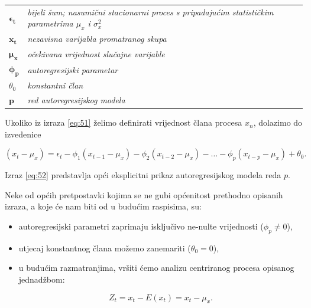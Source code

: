\documentclass[a4paper,12pt,oneside]{memoir}
\begin{document}
            \begin{table}[H]
                \centering
                \begin{tabular*}{0.9\textwidth}{>{\bfseries}l p{13cm}}
                    \textit{\textbf{$\boldsymbol{\epsilon_t}$}} & \textit{bijeli šum; nasumični stacionarni proces s pripadajućim statističkim parametrima $\mu_x$ i $\sigma_x^2$}\\
                    \textit{\textbf{$\boldsymbol{x_t}$}} & \textit{nezavisna varijabla promatranog skupa}\\
                    \textit{\textbf{$\boldsymbol{\mu_x}$}} & \textit{očekivana vrijednost slučajne varijable}\\
                    \textit{\textbf{$\boldsymbol{\phi_p}$}} & \textit{autoregresijski parametar}\\
                    \textit{\textbf{$\theta_0$}} & \textit{konstantni član}\\
                    \textit{\textbf{$\boldsymbol{p}$}} & \textit{red autoregresijskog modela}\\
                \end{tabular*}
            \end{table}

            Ukoliko iz izraza \eqref{eq:51} želimo definirati vrijednost člana procesa $x_n$, dolazimo do izvedenice

            \begin{equation}
                (x_t-\mu_x)=\epsilon_t-\phi_1(x_{t-1}-\mu_x)-\phi_2(x_{t-2}-\mu_x)-\ldots-\phi_p(x_{t-p}-\mu_x)+\theta_0.
                \label{eq:52}
            \end{equation}

            Izraz \eqref{eq:52} predstavlja opći eksplicitni prikaz autoregresijskog modela reda $p$.

            Neke od općih pretpostavki kojima se ne gubi općenitost prethodno opisanih izraza, a koje će nam biti od u budućim raspisima, su:

            \begin{itemize}
                \item autoregresijski parametri zaprimaju isključivo ne-nulte vrijednosti ($\phi_p\neq0$),
                \item utjecaj konstantnog člana možemo zanemariti ($\theta_0=0$),
                \item u budućim razmatranjima, vršiti ćemo analizu centriranog procesa opisanog jednadžbom:
                
                \begin{equation}
                    Z_t=x_t-E(x_t)=x_t-\mu_x.
                    \label{eq:53}
                \end{equation}
            \end{itemize}
\end{document}
